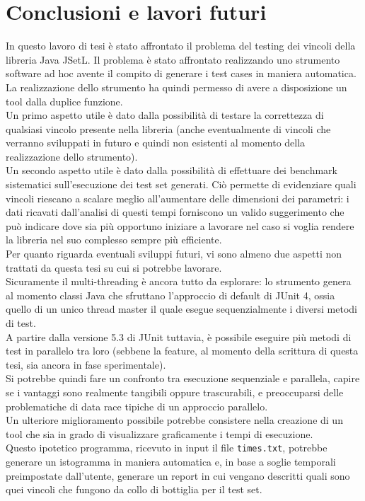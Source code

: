 
\section{Conclusioni e lavori futuri}

In questo lavoro di tesi è stato affrontato il problema del testing dei vincoli della libreria Java JSetL.
Il problema è stato affrontato realizzando uno strumento software ad hoc avente il compito di generare i test cases in maniera automatica.
La realizzazione dello strumento ha quindi permesso di avere a disposizione un tool dalla duplice funzione.\\
Un primo aspetto utile è dato dalla possibilità di testare la correttezza di qualsiasi vincolo presente nella libreria (anche eventualmente di vincoli che verranno sviluppati in futuro e quindi non esistenti al momento della realizzazione dello strumento).\\
Un secondo aspetto utile è dato dalla possibilità di effettuare dei benchmark sistematici sull'esecuzione dei test set generati. 
Ciò permette di evidenziare quali vincoli riescano a scalare meglio all'aumentare delle dimensioni dei parametri: i dati ricavati dall'analisi di questi tempi forniscono un valido suggerimento che può indicare dove sia più opportuno iniziare a lavorare nel caso si voglia rendere la libreria nel suo complesso sempre più efficiente.\\ 

Per quanto riguarda eventuali sviluppi futuri, vi sono almeno due aspetti non trattati da questa tesi su cui si potrebbe lavorare.\\
Sicuramente il multi-threading è ancora tutto da esplorare: lo strumento genera al momento classi Java che sfruttano l'approccio di default di JUnit 4, ossia quello di un unico thread master il quale esegue sequenzialmente i diversi metodi di test.\\
A partire dalla versione 5.3 di JUnit tuttavia, è possibile eseguire più metodi di test in parallelo tra loro (sebbene la feature, al momento della scrittura di questa tesi, sia ancora in fase sperimentale).\\
Si potrebbe quindi fare un confronto tra esecuzione sequenziale e parallela, capire se i vantaggi sono realmente tangibili oppure trascurabili, e preoccuparsi delle problematiche di data race tipiche di un approccio parallelo.\\

Un ulteriore miglioramento possibile potrebbe consistere nella creazione di un tool che sia in grado di visualizzare graficamente i tempi di esecuzione.\\
Questo ipotetico programma, ricevuto in input il file \texttt{times.txt}, potrebbe generare un istogramma in maniera automatica e, in base a soglie temporali preimpostate dall'utente, generare un report in cui vengano descritti quali sono quei vincoli che fungono da collo di bottiglia per il test set.



